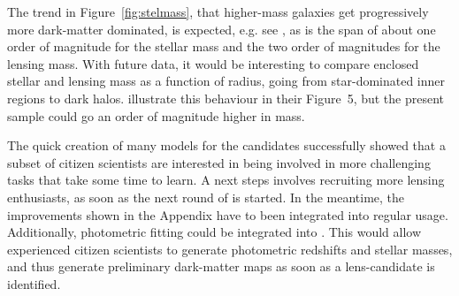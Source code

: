 The trend in Figure~\ref{fig:stelmass}, that higher-mass galaxies get 
progressively more dark-matter dominated, is expected, e.g. see 
\cite{2005ApJ...623L...5F}, as is the span of about one order of magnitude for 
the stellar mass and the two order of magnitudes for the lensing mass. With 
future data, it would be interesting to compare enclosed stellar and lensing 
mass as a function of radius, going from star-dominated inner regions to dark 
halos. \cite{2011ApJ...740...97L} illustrate this behaviour in their Figure~5, 
but the present sample could go an order of magnitude higher in mass.

The quick creation of many models for the {\SW} candidates successfully showed 
that a subset of citizen scientists are interested in being involved in more 
challenging tasks that take some time to learn. A next steps involves 
recruiting more lensing enthusiasts, as soon as the next round of {\SW} is 
started. In the meantime, the improvements shown in the Appendix have to been 
integrated into regular {\SpL} usage. Additionally, photometric fitting could 
be integrated into {\SpL}. This would allow experienced citizen scientists to 
generate photometric redshifts and stellar masses, and thus generate 
preliminary dark-matter maps as soon as a lens-candidate is identified.

